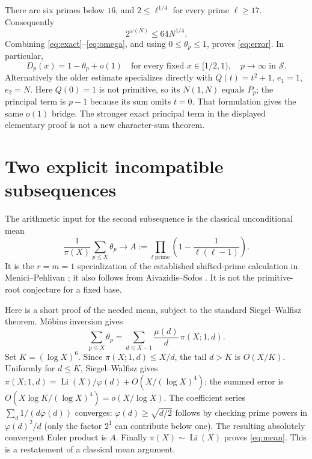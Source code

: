 \documentclass[11pt]{article}
\theoremstyle{remark}
\newcommand{\Li}{\operatorname{Li}}
\begin{document}
There are six primes below $16$, and $2\le\ell^{1/4}$ for every prime
$\ell\ge17$. Consequently
\begin{equation}\label{eq:omega}
 2^{\omega(N)}\le64N^{1/4}.
\end{equation}
Combining \eqref{eq:exact}--\eqref{eq:omega}, and using
$0\le\theta_p\le1$, proves \eqref{eq:error}. In particular,
\begin{equation}\label{eq:bridge}
 D_p(x)=1-\theta_p+o(1)
 \quad\text{for every fixed }x\in[1/2,1),\quad p\to\infty\text{ in }\mathcal S.
\end{equation}
Alternatively the older estimate \cite[(5)--(6), Lemma 1]{BCST}
specializes directly with $Q(t)=t^2+1$, $e_1=1$, $e_2=N$.
Here $Q(0)=1$ is not primitive, so its $N(1,N)$ equals $P_p$;
the principal term is $p-1$ because its sum omits $t=0$.
That formulation gives the same $o(1)$ bridge. The stronger exact
principal term in the displayed elementary proof is not a new
character-sum theorem.

\section{Two explicit incompatible subsequences}
The arithmetic input for the second subsequence is the classical
unconditional mean
\begin{equation}\label{eq:mean}
 \frac1{\pi(X)}\sum_{p\le X}\theta_p\longrightarrow
 A:=\prod_{\ell\ \text{prime}}\left(1-\frac1{\ell(\ell-1)}\right).
\end{equation}
It is the $r=m=1$ specialization of the established shifted-prime
calculation in Menici--Pehlivan \cite[(1), Lemma 2, pp.262--263]{MP};
it also follows from Aivazidis--Sofos \cite[Theorem 1.1(i), $n=1$]{AS}.
It is not the primitive-root conjecture for a fixed base.

Here is a short proof of the needed mean, subject to the standard
Siegel--Walfisz theorem. M\"obius inversion gives
\[
 \sum_{p\le X}\theta_p
 =\sum_{d\le X-1}\frac{\mu(d)}d\,\pi(X;1,d).
\]
Set $K=(\log X)^6$. Since $\pi(X;1,d)\le X/d$, the tail $d>K$ is
$O(X/K)$. Uniformly for $d\le K$, Siegel--Walfisz gives
$\pi(X;1,d)=\Li(X)/\varphi(d)+O(X/(\log X)^4)$;
the summed error is $O(X\log K/(\log X)^4)=o(X/\log X)$.
The coefficient series $\sum_d1/(d\varphi(d))$ converges:
$\varphi(d)\ge\sqrt{d/2}$ follows by checking prime powers in
$\varphi(d)^2/d$ (only the factor $2^1$ can contribute below one).
The resulting absolutely convergent Euler product is $A$.
Finally $\pi(X)\sim\Li(X)$ proves \eqref{eq:mean}.
This is a restatement of a classical mean argument.
\end{document}

